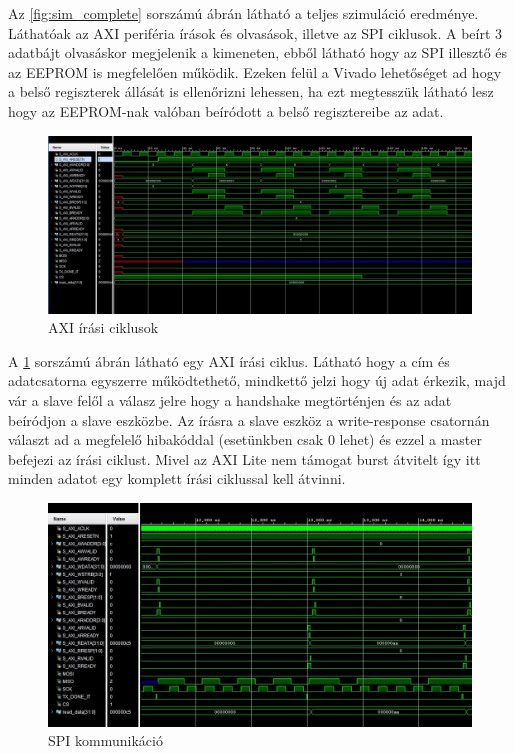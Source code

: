 \documentclass[a4paper,11pt]{article}
\begin{document}
Az \ref{fig:sim_complete} sorszámú ábrán látható a teljes szimuláció eredménye. Láthatóak az AXI periféria írások és olvasások, illetve az SPI ciklusok. A beírt 3 adatbájt olvasáskor megjelenik a kimeneten, ebből látható hogy az SPI illesztő és az EEPROM is megfelelően működik. Ezeken felül a Vivado lehetőséget ad hogy a belső regiszterek állását is ellenőrizni lehessen, ha ezt megtesszük látható lesz hogy az EEPROM-nak valóban beíródott a belső regisztereibe az adat.

\begin{figure}[H]
	\begin{center}
	\includegraphics[scale=0.5]{axi_write.JPG}
	\caption{AXI írási ciklusok}	
	\label{fig:axi_write}
	\end{center}
\end{figure}

A \ref{fig:axi_write} sorszámú ábrán látható egy AXI írási ciklus. Látható hogy a cím és adatcsatorna egyszerre működtethető, mindkettő jelzi hogy új adat érkezik, majd vár a slave felől a válasz jelre hogy a handshake megtörténjen és az adat beíródjon a slave eszközbe. Az írásra a slave eszköz a write-response csatornán választ ad a megfelelő hibakóddal (esetünkben csak 0 lehet) és ezzel a master befejezi az írási ciklust. Mivel az AXI Lite nem támogat burst átvitelt így itt minden adatot egy komplett írási ciklussal kell átvinni.

\begin{figure}[H]
	\begin{center}
	\includegraphics[scale=0.7]{SPI.JPG}	
	\end{center}
	\caption{SPI kommunikáció}
	\label{fig:spisim}
\end{figure}
\end{document}
